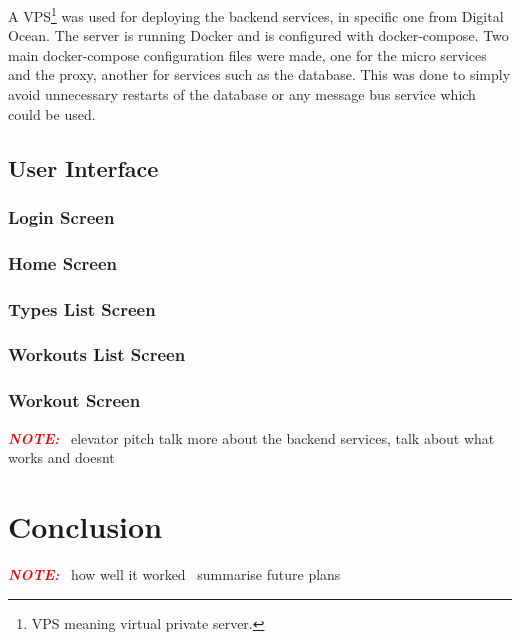 \documentclass{article}
\newcommand{\vspaceconst}{-2ex}
\newcommand{\NOTE}{\textbf{\textit{\textcolor{red}{NOTE:}}} }
\begin{document}
\begin{multicols}{2}
A VPS\footnote{VPS meaning virtual private server.} was used for deploying the backend services, in specific one from Digital Ocean\cite{digitalOcean}. The server is running Docker and is configured with docker-compose. Two main docker-compose configuration files were made, one for the micro services and the proxy, another for services such as the database. This was done to simply avoid unnecessary restarts of the database or any message bus service which could be used.\\

\subsection{User Interface}
\vspace{\vspaceconst}

\subsubsection{Login Screen}
\vspace{\vspaceconst}

\subsubsection{Home Screen}
\vspace{\vspaceconst}

\subsubsection{Types List Screen}
\vspace{\vspaceconst}

\subsubsection{Workouts List Screen}
\vspace{\vspaceconst}

\subsubsection{Workout Screen}
\vspace{\vspaceconst}


\NOTE~elevator pitch talk more about the backend services, talk about what works and doesnt

\section{Conclusion}
\vspace{\vspaceconst}
\NOTE~how well it worked
\NTOE~summarise future plans


\end{multicols}
\end{document}
